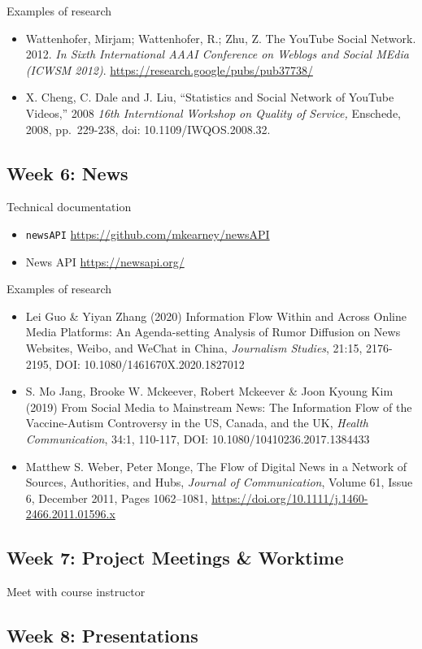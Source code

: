 \documentclass[11pt,]{article}
\providecommand{\tightlist}{%
  \setlength{\itemsep}{0pt}\setlength{\parskip}{0pt}}
\begin{document}
Examples of research

\begin{itemize}
\tightlist
\item
  Wattenhofer, Mirjam; Wattenhofer, R.; Zhu, Z. The YouTube Social
  Network. 2012. \emph{In Sixth International AAAI Conference on Weblogs
  and Social MEdia (ICWSM 2012)}.
  \url{https://research.google/pubs/pub37738/}
\item
  X. Cheng, C. Dale and J. Liu, ``Statistics and Social Network of
  YouTube Videos,'' 2008 \emph{16th Interntional Workshop on Quality of
  Service,} Enschede, 2008, pp.~229-238, doi: 10.1109/IWQOS.2008.32.
\end{itemize}

\hypertarget{week-6-news}{%
\subsection{Week 6: News}\label{week-6-news}}

Technical documentation

\begin{itemize}
\tightlist
\item
  \texttt{newsAPI} \url{https://github.com/mkearney/newsAPI}
\item
  News API \url{https://newsapi.org/}
\end{itemize}

Examples of research

\begin{itemize}
\tightlist
\item
  Lei Guo \& Yiyan Zhang (2020) Information Flow Within and Across
  Online Media Platforms: An Agenda-setting Analysis of Rumor Diffusion
  on News Websites, Weibo, and WeChat in China, \emph{Journalism
  Studies}, 21:15, 2176-2195, DOI: 10.1080/1461670X.2020.1827012
\item
  S. Mo Jang, Brooke W. Mckeever, Robert Mckeever \& Joon Kyoung Kim
  (2019) From Social Media to Mainstream News: The Information Flow of
  the Vaccine-Autism Controversy in the US, Canada, and the UK,
  \emph{Health Communication}, 34:1, 110-117, DOI:
  10.1080/10410236.2017.1384433
\item
  Matthew S. Weber, Peter Monge, The Flow of Digital News in a Network
  of Sources, Authorities, and Hubs, \emph{Journal of Communication},
  Volume 61, Issue 6, December 2011, Pages 1062--1081,
  \url{https://doi.org/10.1111/j.1460-2466.2011.01596.x}
\end{itemize}

\hypertarget{week-7-project-meetings-worktime}{%
\subsection{Week 7: Project Meetings \&
Worktime}\label{week-7-project-meetings-worktime}}

Meet with course instructor

\hypertarget{week-8-presentations}{%
\subsection{Week 8: Presentations}\label{week-8-presentations}}
\end{document}
